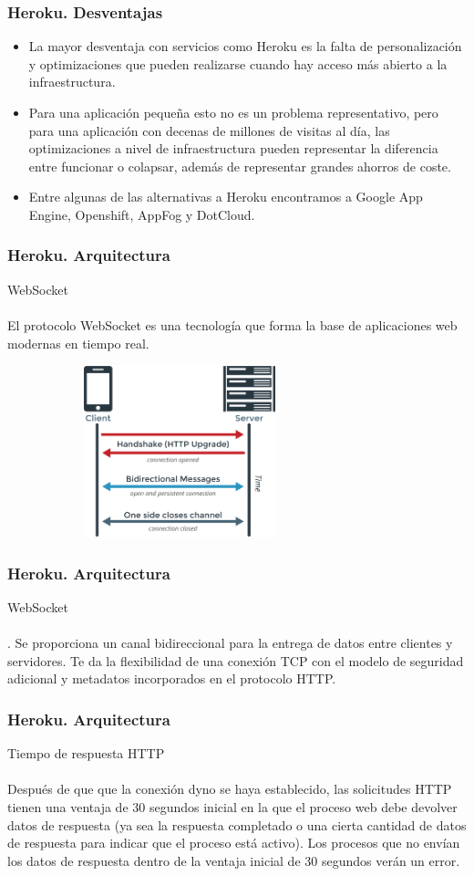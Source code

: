 \documentclass{beamer}
\begin{document}
\begin{frame}
\frametitle{Heroku. Desventajas}
\begin{itemize}
	\item La mayor desventaja con servicios como Heroku es la falta de personalización y optimizaciones que pueden realizarse cuando hay acceso más abierto a la infraestructura.
	\item Para una aplicación pequeña esto no es un problema representativo, pero para una aplicación con decenas de millones de visitas al día, las optimizaciones a nivel de infraestructura pueden representar la diferencia entre funcionar o colapsar, además de representar grandes ahorros de coste.
	\item Entre algunas de las alternativas a Heroku encontramos a Google App Engine, Openshift, AppFog y DotCloud.
\end{itemize}
\end{frame}

\begin{frame}
\frametitle{Heroku. Arquitectura}
\centering WebSocket\\ \ \\
El protocolo WebSocket es una tecnología que forma la base de aplicaciones web modernas en tiempo real.

\includegraphics[width=10cm,height=5cm]{arquitectura/1.png}
\end{frame}

\begin{frame}
	\frametitle{Heroku. Arquitectura}
	\centering WebSocket\\ \ \\
	. Se proporciona un canal bidireccional para la entrega de datos entre clientes y servidores. Te da la flexibilidad de una conexión TCP con el modelo de seguridad adicional y metadatos incorporados en el protocolo HTTP.
	

\end{frame}

\begin{frame}
\frametitle{Heroku. Arquitectura}
Tiempo de respuesta HTTP\\ \ \\
Después de que que la conexión dyno se haya establecido, las solicitudes HTTP tienen una ventaja de 30 segundos inicial en la que el proceso web debe devolver datos de respuesta (ya sea la respuesta completado o una cierta cantidad de datos de respuesta para indicar que el proceso está activo). Los procesos que no envían los datos de respuesta dentro de la ventaja inicial de 30 segundos verán un error.\\
\end{frame}
\end{document}
